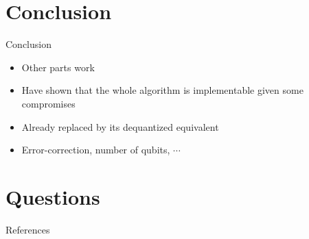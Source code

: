 \documentclass{beamer}
\begin{document}
\section{Conclusion}

\begin{frame}{Conclusion}
    \begin{itemize}
        \item Other parts work\pause
        \item Have shown that the whole algorithm is implementable given some compromises\pause
        \item Already replaced by its dequantized equivalent\pause
        \item Error-correction, number of qubits, $\cdots$
    \end{itemize}
\end{frame}

\section{Questions}


\begin{frame}[allowframebreaks]{References}
    \printbibliography
\end{frame}
\end{document}
